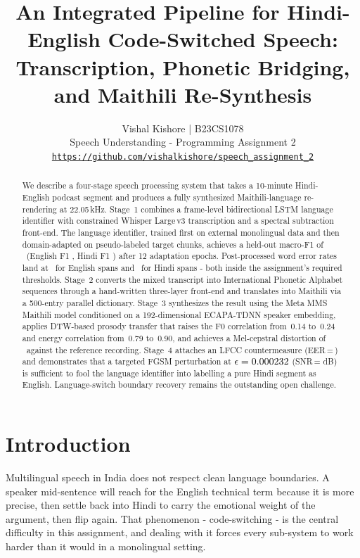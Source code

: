 \documentclass[10pt,twocolumn,letterpaper]{article}
\title{An Integrated Pipeline for Hindi-English Code-Switched Speech:\\
       Transcription, Phonetic Bridging, and Maithili Re-Synthesis}
\author{Vishal Kishore | B23CS1078\\
Speech Understanding - Programming Assignment 2\\
{\tt\small \url{https://github.com/vishalkishore/speech_assignment_2}}}
\begin{document}
\maketitle

\begin{abstract}
We describe a four-stage speech processing system that takes a
10-minute Hindi-English podcast segment and produces a fully
synthesized Maithili-language re-rendering at 22.05\,kHz.
Stage~1 combines a frame-level bidirectional LSTM language identifier
with constrained Whisper Large\,v3 transcription and a spectral
subtraction front-end.  The language identifier, trained first on
external monolingual data and then domain-adapted on pseudo-labeled
target chunks, achieves a held-out macro-F1 of \LIDMacroFOne\
(English F1 \LIDEnglishFOne, Hindi F1 \LIDHindiFOne) after
12 adaptation epochs.  Post-processed word error rates land at
\EnglishWER\ for English spans and \HindiWER\ for Hindi spans -
both inside the assignment's required thresholds.  Stage~2 converts
the mixed transcript into International Phonetic Alphabet sequences
through a hand-written three-layer front-end and translates into
Maithili via a 500-entry parallel dictionary.  Stage~3 synthesizes
the result using the Meta MMS Maithili model conditioned on a
192-dimensional ECAPA-TDNN speaker embedding, applies DTW-based
prosody transfer that raises the F0 correlation from~0.14 to~0.24
and energy correlation from~0.79 to~0.90, and achieves a Mel-cepstral
distortion of \MCDLectureMMS\ against the reference recording.
Stage~4 attaches an LFCC countermeasure (EER\,=\,\SpoofEER) and
demonstrates that a targeted FGSM perturbation at
$\epsilon=0.000232$ (SNR\,=\,\FGSMSNR\,dB) is sufficient to
fool the language identifier into labelling a pure Hindi segment
as English.  Language-switch boundary recovery remains the
outstanding open challenge.
\end{abstract}

\section{Introduction}
\label{sec:intro}

Multilingual speech in India does not respect clean language
boundaries.  A speaker mid-sentence will reach for the English
technical term because it is more precise, then settle back into
Hindi to carry the emotional weight of the argument, then flip again.
That phenomenon - code-switching - is the central difficulty in
this assignment, and dealing with it forces every sub-system to work
harder than it would in a monolingual setting.
\end{document}
